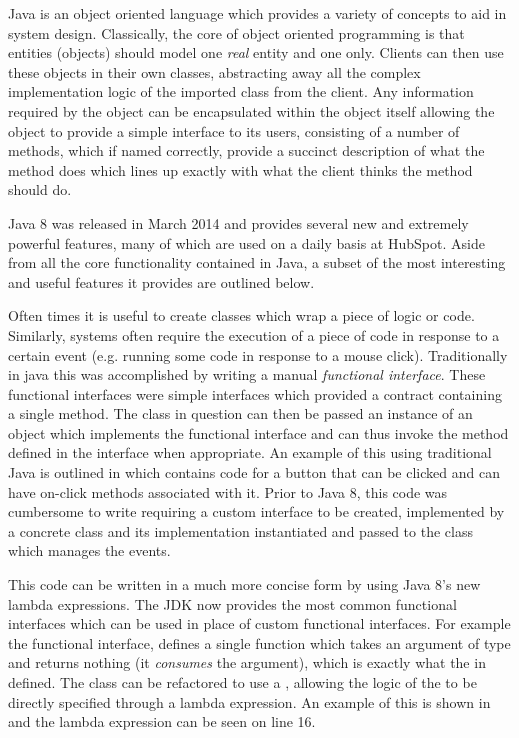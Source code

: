 Java is an object oriented language which provides a variety of concepts to aid in system design. Classically, the core of object oriented programming is that entities (objects) should model one \textit{real} entity and one only. Clients can then use these objects in their own classes, abstracting away all the complex implementation logic of the imported class from the client. Any information required by the object can be encapsulated within the object itself allowing the object to provide a simple interface to its users, consisting of a number of methods, which if named correctly, provide a succinct description of what the method does which lines up exactly with what the client thinks the method should do.

Java 8 was released in March 2014 and provides several new and extremely powerful features, many of which are used on a daily basis at HubSpot. Aside from all the core functionality contained in Java, a subset of the most interesting and useful features it provides are outlined below.

Often times it is useful to create classes which wrap a piece of logic or code. Similarly, systems often require the execution of a piece of code in response to a certain event (e.g. running some code in response to a mouse click). Traditionally in java this was accomplished by writing a manual \textit{functional interface}. These functional interfaces were simple interfaces which provided a contract containing a single method. The class in question can then be passed an instance of an object which implements the functional interface and can thus invoke the method defined in the interface when appropriate. An example of this using traditional Java is outlined in  which contains code for a button that can be clicked and can have on-click methods associated with it. Prior to Java 8, this code was cumbersome to write requiring a custom interface to be created, implemented by a concrete class and its implementation instantiated and passed to the class which manages the events. 



This code can be written in a much more concise form by using Java 8's new lambda expressions. The JDK now provides the most common functional interfaces which can be used in place of custom functional interfaces. For example the  functional interface, defines a single  function which takes an argument of type  and returns nothing (it \textit{consumes} the argument), which is exactly what the  in  defined. The  class can be refactored to use a , allowing the logic of the  to be directly specified through a lambda expression. An example of this is shown in  and the lambda expression can be seen on line 16.
\vfill

